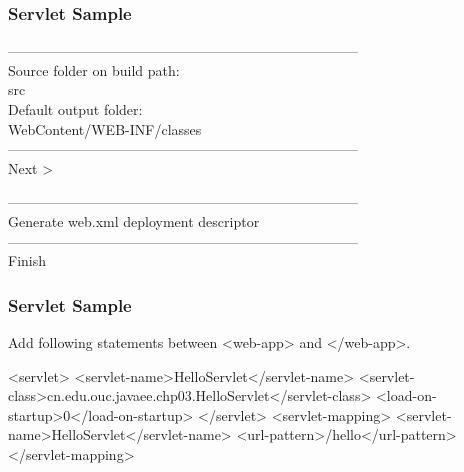 \begin{frame}[fragile] %
\frametitle{Servlet Sample} 

---------------------------------------------------------------------------\\
Source folder on build path: \\ {\Blue src}\\
Default output folder: \\ {\Blue WebContent/WEB-INF/classes}\\
---------------------------------------------------------------------------\\

 Next >

---------------------------------------------------------------------------\\
{\Blue{}} Generate web.xml deployment descriptor\\
---------------------------------------------------------------------------\\
 Finish
\end{frame}

\begin{frame}[fragile] %
\frametitle{Servlet Sample} 


Add following statements between <web-app> and </web-app>.
\begin{xmlCode}
<servlet>
	<servlet-name>HelloServlet</servlet-name>
	<servlet-class>cn.edu.ouc.javaee.chp03.HelloServlet</servlet-class>
	<load-on-startup>0</load-on-startup>
</servlet>
<servlet-mapping>
	<servlet-name>HelloServlet</servlet-name>
	<url-pattern>/hello</url-pattern>
</servlet-mapping>  
\end{xmlCode}
\end{frame}

